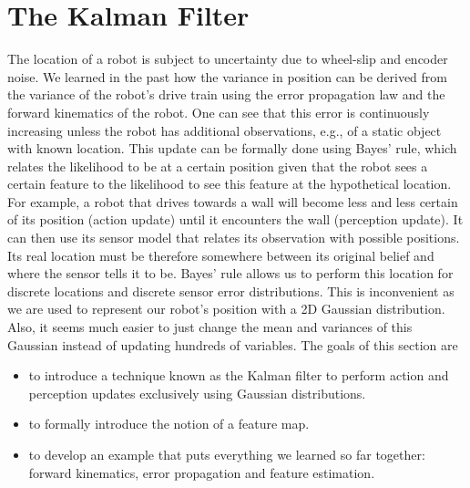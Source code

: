 \section{The Kalman Filter}
The location of a robot is subject to uncertainty due to wheel-slip and encoder noise. We learned in the past how the variance in position can be derived from the variance of the robot's drive train using the error propagation law and the forward kinematics of the robot. One can see that this error is continuously increasing unless the robot has additional observations, e.g., of a static object with known location. This update can be formally done using Bayes' rule, which relates the likelihood to be at a certain position given that the robot sees a certain feature to the likelihood to see this feature at the hypothetical location. For example, a robot that drives towards a wall will become less and less certain of its position (action update) until it encounters the wall (perception update). It can then use its sensor model that relates its observation with possible positions. Its real location must be therefore somewhere between its original belief and where the sensor tells it to be. Bayes' rule allows us to perform this location for discrete locations and discrete sensor error distributions. This is inconvenient as we are used to represent our robot's position with a 2D Gaussian distribution. Also, it seems much easier to just change the mean and variances of this Gaussian instead of updating hundreds of variables. The goals of this section are
\begin{itemize}
\item to introduce a technique known as the Kalman filter to perform action and perception updates exclusively using Gaussian distributions.
\item to formally introduce the notion of a feature map.
\item to develop an example that puts everything we learned so far together: forward kinematics, error propagation and feature estimation.
\end{itemize}

